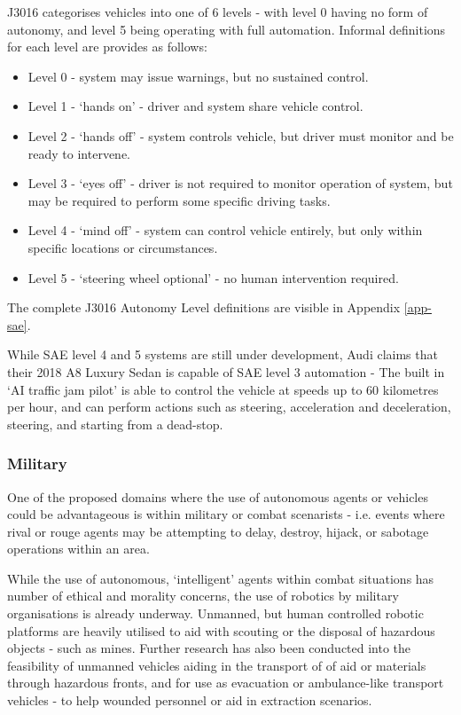 J3016 categorises vehicles into one of 6 levels - with level 0 having no form
of autonomy, and level 5 being operating with full automation.
Informal definitions for each level are provides as follows:

\begin{itemize}
\item Level 0 - system may issue warnings, but no sustained control.
\item Level 1 - `hands on' - driver and system share vehicle control.
\item Level 2 - `hands off' - system controls vehicle, but driver must monitor
                and be ready to intervene.
\item Level 3 - `eyes off' - driver is not required to monitor operation of
                system, but may be required to perform some specific driving tasks.
\item Level 4 - `mind off' - system can control vehicle entirely, but only
                within specific locations or circumstances.
\item Level 5 - `steering wheel optional' - no human intervention required.
\end{itemize}

The complete J3016 Autonomy Level definitions are visible in Appendix \ref{app-sae}. 

While SAE level 4 and 5 systems are still under development, Audi claims that
their 2018 A8 Luxury Sedan is capable of SAE level 3 automation - The built
in `AI traffic jam pilot' is able to control the vehicle at speeds up to 60
kilometres per hour, and can perform actions such as steering, acceleration
and deceleration, steering, and starting from a dead-stop.




\subsubsection{Military}
One of the proposed domains where the use of autonomous agents or vehicles
could be advantageous is within military or combat scenarists - i.e. events
where rival or rouge agents may be attempting to delay, destroy, hijack, or
sabotage operations within an area.

While the use of autonomous, `intelligent' agents within combat situations
has number of ethical and morality concerns, the use of robotics by military
organisations is already underway.
Unmanned, but human controlled robotic platforms are heavily utilised to aid
with scouting or the disposal of hazardous objects - such as mines.
Further research has also been conducted into the feasibility of unmanned
vehicles aiding in the transport of of aid or materials through hazardous
fronts, and for use as evacuation or ambulance-like transport vehicles - to
help wounded personnel or aid in extraction scenarios.

